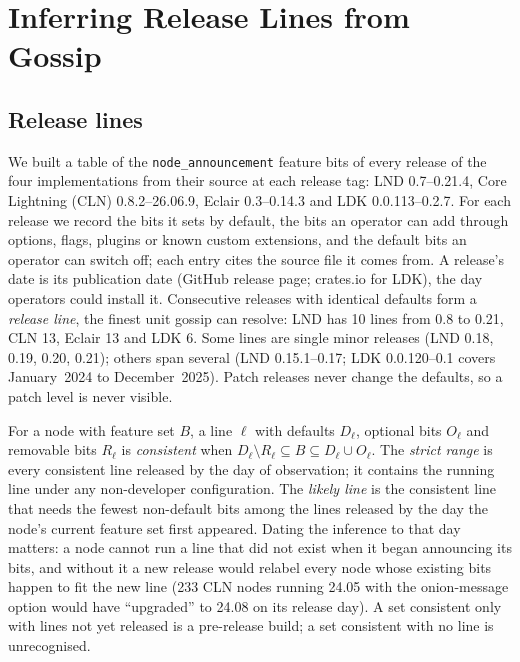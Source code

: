 \section{Inferring Release Lines from Gossip}
\label{sec:inference}

\subsection{Release lines}
We built a table of the \texttt{node\_announcement} feature bits of every release of the four implementations from
their source at each release tag: LND 0.7--0.21.4, Core Lightning (CLN) 0.8.2--26.06.9, Eclair 0.3--0.14.3 and LDK
0.0.113--0.2.7. For each release we record the bits it sets by default, the bits an operator can add through
options, flags, plugins or known custom extensions, and the default bits an operator can switch off; each entry
cites the source file it comes from. A release's date is its publication date (GitHub release page; crates.io for
LDK), the day operators could install it. Consecutive releases with identical defaults form a \emph{release line}, the
finest unit gossip can resolve: LND has 10 lines from 0.8 to 0.21, CLN 13, Eclair 13 and LDK 6. Some lines are
single minor releases (LND 0.18, 0.19, 0.20, 0.21); others span several (LND 0.15.1--0.17; LDK 0.0.120--0.1 covers
January~2024 to December~2025). Patch releases never change the defaults, so a patch level is never visible.

For a node with feature set $B$, a line $\ell$ with defaults $D_\ell$, optional bits $O_\ell$ and removable bits
$R_\ell$ is \emph{consistent} when $D_\ell \setminus R_\ell \subseteq B \subseteq D_\ell \cup O_\ell$. The
\emph{strict range} is every consistent line released by the day of observation; it contains the running line under
any non-developer configuration. The \emph{likely line} is the consistent line that needs the fewest non-default
bits among the lines released by the day the node's current feature set first appeared. Dating the inference to
that day matters: a node cannot run a line that did not exist when it began announcing its bits, and without it a
new release would relabel every node whose existing bits happen to fit the new line (233 CLN nodes running 24.05 with
the onion-message option would have ``upgraded'' to 24.08 on its release day). A set consistent only with lines not
yet released is a pre-release build; a set consistent with no line is unrecognised.

